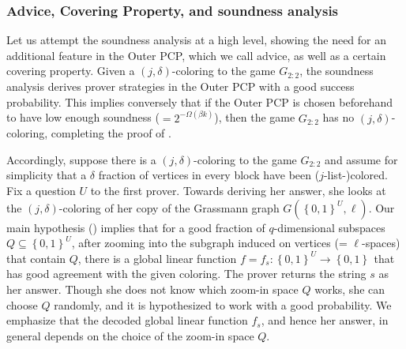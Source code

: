 \documentclass{toc}
\newcommand\set[1]{{\left\{ #1 \right\}}}
\newcommand\power[1]{\set{0,1}^{#1}}
\begin{document}
%
\subsubsection{Advice, Covering Property, and soundness analysis}

Let us attempt the soundness analysis at a
high level, showing the need for an additional
%
feature in the Outer PCP, which we call advice, as well as a certain
covering property.
%
Given a $(j,\delta)$-coloring to
the game $G_{2:2}$, the soundness analysis derives prover strategies in the Outer PCP with a good success probability.
This implies conversely that if the Outer PCP is chosen beforehand to have low enough soundness ($= 2^{-\Omega(\beta k)}$), then
the game $G_{2:2}$ has no $(j,\delta)$-coloring, completing the proof of .

Accordingly, suppose there is a $(j,\delta)$-coloring to the game $G_{2:2}$ and assume for simplicity
that a $\delta$ fraction of vertices in every block have been ($j$-list-)colored. Fix a question $U$ to the first prover. Towards
deriving her answer, she looks at the $(j,\delta)$-coloring of her copy of the Grassmann graph $G(\power{U},\ell)$.
Our main hypothesis
() implies that for a good fraction of $q$-dimensional subspaces $Q \subseteq \power{U}$, after zooming into the
subgraph induced on vertices (= $\ell$-spaces) that contain $Q$, there is a global linear function $f = f_s:\power{U} \to \power{}$
that has good agreement with the given coloring. The prover returns the string $s$ as her answer. Though
she does not know which zoom-in space $Q$ works, she can choose $Q$ randomly, and it is hypothesized  to work with a good
probability. We emphasize that the decoded
%
global linear function $f_s$, and hence her answer, in general depends on the choice of the zoom-in space $Q$.
\end{document}
